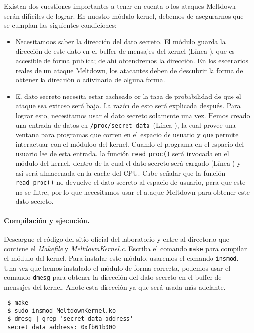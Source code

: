Existen dos cuestiones importantes a tener en cuenta o los ataques Meltdown serán difíciles de lograr. En nuestro módulo kernel, debemos de asegurarnos que se cumplan las siguientes condiciones:

\begin{itemize}
\item Necesitamoos saber la dirección del dato secreto. El módulo guarda la dirección de este dato en el buffer de mensajes del kernel (Línea ), que es accesible de forma pública; de ahí obtendremos la dirección. En los escenarios reales de un ataque Meltdown, los atacantes deben de descubrir la forma de obtener la dirección o adivinarla de alguna forma.

\item El dato secreto necesita estar cacheado or la taza de probabilidad de que el ataque sea exitoso será baja.  La razón de esto será explicada después. Para lograr esto, necesitamos usar el dato secreto solamente una vez. Hemos creado una entrada de datos en \texttt{/proc/secret\_data}~(Línea ), la cual provee una ventana para programas que corren en el espacio de usuario y que permite interactuar con el móduloo del kernel. Cuando el programa en el espacio del usuario lee de esta entrada, la función \texttt{read\_proc()} será invocada en el módulo del kernel, dentro de la cual el dato secreto será cargado (Línea ) y así será almacenada en la cache del CPU.
Cabe señalar que la función \texttt{read\_proc()} no devuelve el dato secreto al espacio de usuario, para que este no se filtre, por lo que necesitamos usar el ataque Meltdown para obtener este dato secreto.
\end{itemize}


\paragraph{Compilación y ejecución.}
Descargue el código del sitio oficial del laboratorio y entre al directorio que contiene el \textit{Makefile} y \textit{MeltdownKernel.c}. Escriba el comando \texttt{make} para compilar el módulo del kernel.
Para instalar este módulo, usaremos el comando  \texttt{insmod}. Una vez que hemos instalado el módulo de forma correcta, podemos usar el comando \texttt{dmesg} para obtener la dirección del dato secreto en el buffer de mensajes del kernel. Anote esta dirección ya que será usada más adelante.

\begin{lstlisting}
 $ make
 $ sudo insmod MeltdownKernel.ko
 $ dmesg | grep 'secret data address'
 secret data address: 0xfb61b000
\end{lstlisting}
 



